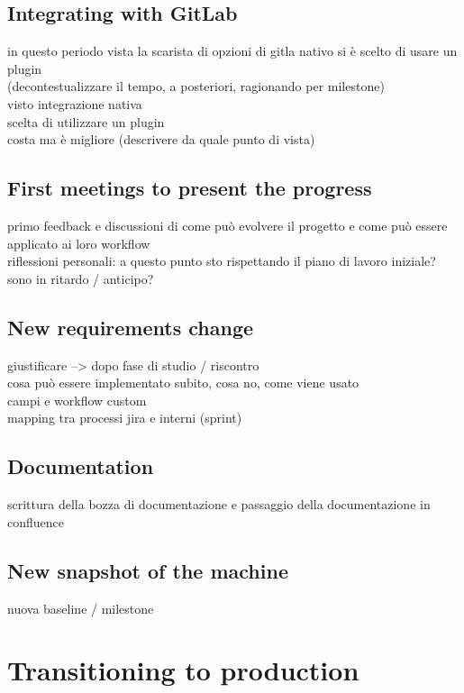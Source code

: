 	\subsection{Integrating with GitLab}
		in questo periodo vista la scarista di opzioni di gitla nativo si è scelto di usare un plugin\\
		(decontestualizzare il tempo, a posteriori, ragionando per milestone)\\
		visto integrazione nativa\\
		scelta di utilizzare un plugin\\
		costa ma è migliore (descrivere da quale punto di vista)
	
	\subsection{First meetings to present the progress}
		primo feedback e discussioni di come può evolvere il progetto e come può essere applicato ai loro workflow\\
		riflessioni personali: a questo punto sto rispettando il piano di lavoro iniziale? sono in ritardo / anticipo?
	
	\subsection{New requirements change}
		giustificare --> dopo fase di studio / riscontro\\
		cosa può essere implementato subito, cosa no, come viene usato\\
		campi e workflow custom\\
		mapping tra processi jira e interni (sprint)
	
	\subsection{Documentation}
		scrittura della bozza di documentazione e passaggio della documentazione in confluence
		
	\subsection{New snapshot of the machine}
		nuova baseline / milestone

\section{Transitioning to production}


